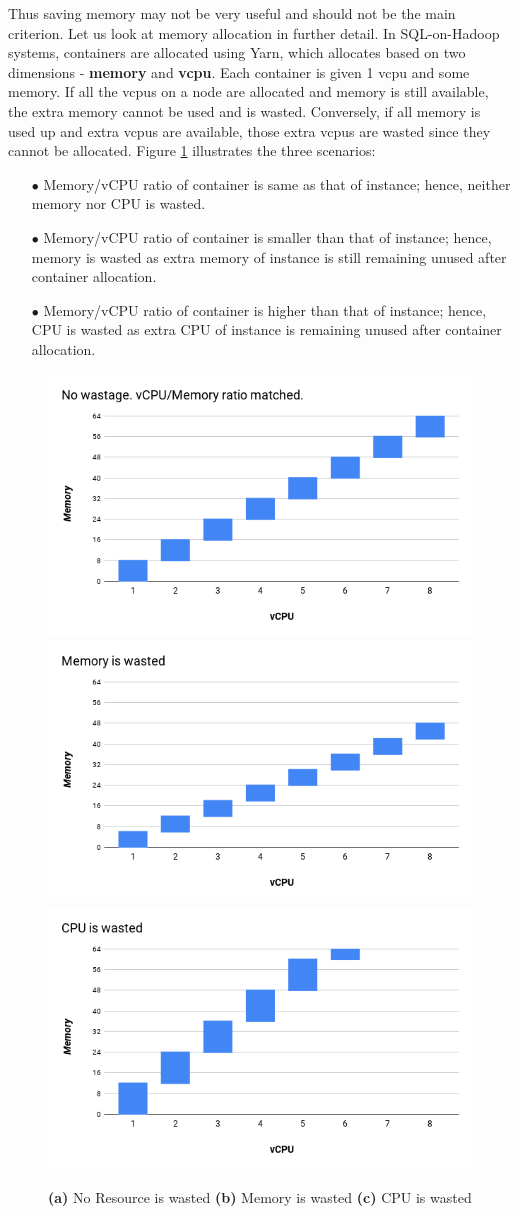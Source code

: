 Thus saving memory may not be very useful and should not be the main criterion. Let us look at memory allocation in further detail. In SQL-on-Hadoop systems, containers are allocated using Yarn, which allocates based on two dimensions - \textbf{memory} and \textbf{vcpu}. Each container is given 1 vcpu and some memory. If all the vcpus on a node are allocated and memory is still available, the extra memory cannot be used and is wasted. Conversely, if all memory is used up and extra vcpus are available, those extra vcpus are wasted since they cannot be allocated. 
Figure \ref{fig:container_shape} illustrates the three scenarios:
\begin{enumerate}[label=(\alph*)]
	\item[$\bullet$] Memory/vCPU ratio of container is same as that of instance; hence, neither memory nor CPU is wasted. 
	\item[$\bullet$] Memory/vCPU ratio of container is smaller than that of instance; hence, memory is wasted as extra memory of instance is still remaining unused after container allocation.
	\item[$\bullet$] Memory/vCPU ratio of container is higher than that of instance; hence, CPU is wasted as extra CPU of instance is remaining unused after container allocation.
\end{enumerate}
\begin{figure}[h]
	\includegraphics[width=0.3\linewidth]{container_shape1.png} 
	\includegraphics[width=0.3\linewidth]{container_shape2.png}
	\includegraphics[width=0.3\linewidth]{container_shape3.png}
	\caption{\textbf{(a)} No Resource is wasted \textbf{(b)} Memory is wasted \textbf{(c)} CPU is wasted}
	\label{fig:container_shape}
\end{figure}

